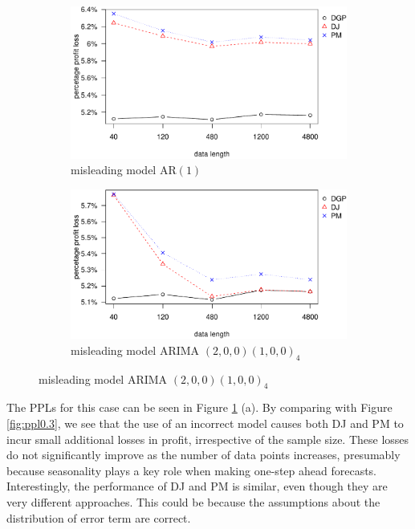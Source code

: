 \documentclass{article}
\begin{document}
\begin{figure}
\centering
\caption{Percentage profit loss vs. data size in misleading model}
\begin{subfigure}[b]{0.48\textwidth}
\centering
\includegraphics[width=\textwidth]{information-plot_files/figure-latex/AR(1)ppl-1.pdf}
\caption{misleading model AR$(1)$}
\end{subfigure}
\hfill
\begin{subfigure}[b]{0.48\textwidth}
\centering
\includegraphics[width=\textwidth]{information-plot_files/figure-latex/SAR(3)(1)_4ppl-1.pdf}
\caption{misleading model ARIMA $(2,0,0)(1,0,0)_4$}
\end{subfigure}
\label{fig:mis}
\end{figure}

The PPLs for this case can be seen in Figure
\ref{fig:mis} (a). By comparing with Figure \ref{fig:ppl0.3}, we see that the use of an incorrect model causes both DJ and PM to incur small additional losses in profit, irrespective of the sample size. These losses do not significantly improve as the number of data points increases, presumably because seasonality plays a key role when making one-step ahead forecasts. Interestingly, the performance of DJ and PM is similar, even though they are very different approaches. This could be because the assumptions about the distribution of error term are correct.
\end{document}
